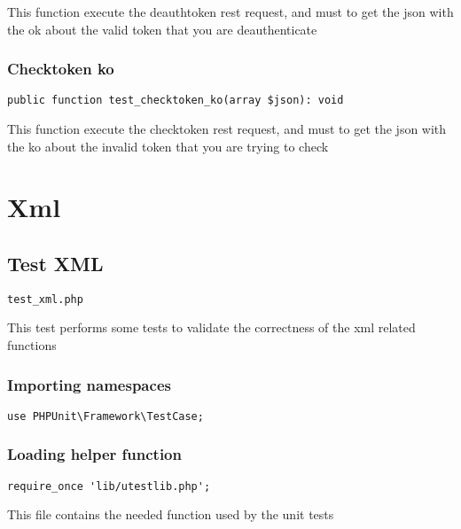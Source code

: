 \documentclass[a4paper]{article}
\begin{document}
This function execute the deauthtoken rest request, and must to get the
json with the ok about the valid token that you are deauthenticate

\hypertarget{toc458}{}
\subsubsection{Checktoken ko}

\begin{lstlisting}
public function test_checktoken_ko(array $json): void
\end{lstlisting}

This function execute the checktoken rest request, and must to get the
json with the ko about the invalid token that you are trying to check


\hypertarget{toc459}{}
\section{Xml}

\hypertarget{toc460}{}
\subsection{Test XML}

\begin{lstlisting}
test_xml.php
\end{lstlisting}

This test performs some tests to validate the correctness
of the xml related functions

\hypertarget{toc461}{}
\subsubsection{Importing namespaces}

\begin{lstlisting}
use PHPUnit\Framework\TestCase;
\end{lstlisting}

\hypertarget{toc462}{}
\subsubsection{Loading helper function}

\begin{lstlisting}
require_once 'lib/utestlib.php';
\end{lstlisting}

This file contains the needed function used by the unit tests
\end{document}
